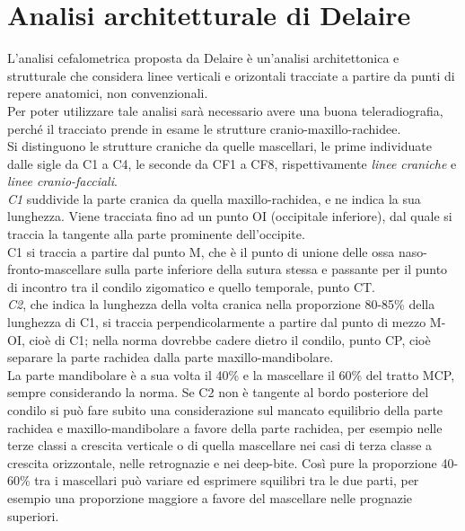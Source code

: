 \chapter{Analisi architetturale di Delaire}
L'analisi cefalometrica proposta da Delaire è un'analisi architettonica e strutturale che considera linee verticali e orizontali tracciate a partire da punti di repere anatomici, non convenzionali.\\
Per poter utilizzare tale analisi sarà necessario avere una buona teleradiografia, perché il tracciato prende in esame le strutture cranio-maxillo-rachidee.\\

Si distinguono le strutture craniche da quelle mascellari, le prime individuate dalle sigle da C1 a C4, le seconde da CF1 a CF8, rispettivamente \emph{linee craniche} e \emph{linee cranio-facciali}.\\

\emph{C1} suddivide la parte cranica da quella maxillo-rachidea, e ne indica la sua lunghezza. Viene tracciata fino ad un punto OI (occipitale inferiore), dal quale si traccia la tangente alla parte prominente dell'occipite.\\
C1 si traccia a partire dal punto M, che è il punto di unione delle ossa naso-fronto-mascellare sulla parte inferiore della sutura stessa e passante per il punto di incontro tra il condilo zigomatico e quello temporale, punto CT.\\

\emph{C2}, che indica la lunghezza della volta cranica nella proporzione 80-85\% della lunghezza di C1, si traccia perpendicolarmente a partire dal punto di mezzo M-OI, cioè di C1; nella norma dovrebbe cadere dietro il condilo, punto CP, cioè separare la parte rachidea dalla parte maxillo-mandibolare.\\
La parte mandibolare è a sua volta il 40\% e la mascellare il 60\% del tratto MCP, sempre considerando la norma. Se C2 non è tangente al bordo posteriore del condilo si può fare subito una considerazione sul mancato equilibrio della parte rachidea e maxillo-mandibolare a favore della parte rachidea, per esempio nelle terze classi a crescita verticale o di quella mascellare nei casi di terza classe a crescita orizzontale, nelle retrognazie e nei deep-bite. Così pure la proporzione 40-60\% tra i mascellari può variare ed esprimere squilibri tra le due parti, per esempio una proporzione maggiore a favore del mascellare nelle prognazie superiori.\\

